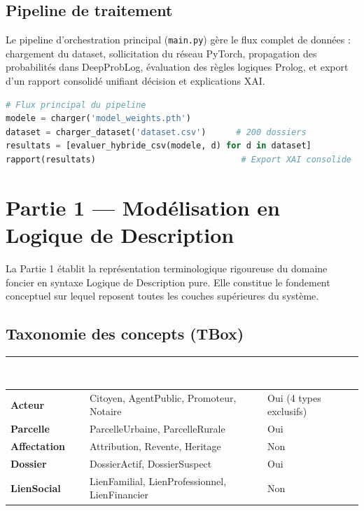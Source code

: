 \documentclass[11pt,a4paper]{report}
\begin{document}
\section{Pipeline de traitement}

Le pipeline d'orchestration principal (\texttt{main.py}) gère le flux complet de données :
chargement du dataset, sollicitation du réseau PyTorch, propagation des probabilités
dans DeepProbLog, évaluation des règles logiques Prolog, et export d'un rapport
consolidé unifiant décision et explications XAI.

\begin{lstlisting}[language=Python]
# Flux principal du pipeline
modele = charger('model_weights.pth')
dataset = charger_dataset('dataset.csv')      # 200 dossiers
resultats = [evaluer_hybride_csv(modele, d) for d in dataset]
rapport(resultats)                             # Export XAI consolide
\end{lstlisting}

\chapter*{Partie 1 — Modélisation en Logique de Description}

La Partie 1 établit la représentation terminologique rigoureuse du domaine foncier
en syntaxe Logique de Description pure. Elle constitue le fondement conceptuel sur
lequel reposent toutes les couches supérieures du système.

\section{Taxonomie des concepts (TBox)}

\begin{center}
\begin{tabular}{>{\bfseries}p{3cm} p{7cm} p{3.5cm}}
\toprule
\rowcolor{tablehead}\textcolor{white}{Concept racine} & \textcolor{white}{Sous-concepts} & \textcolor{white}{Disjonction} \\
\midrule
Acteur      & Citoyen, AgentPublic, Promoteur, Notaire        & Oui (4 types exclusifs) \\
Parcelle    & ParcelleUrbaine, ParcelleRurale                  & Oui \\
Affectation & Attribution, Revente, Heritage                   & Non \\
Dossier     & DossierActif, DossierSuspect                     & Oui \\
LienSocial  & LienFamilial, LienProfessionnel, LienFinancier   & Non \\
\bottomrule
\end{tabular}
\end{center}
\end{document}
